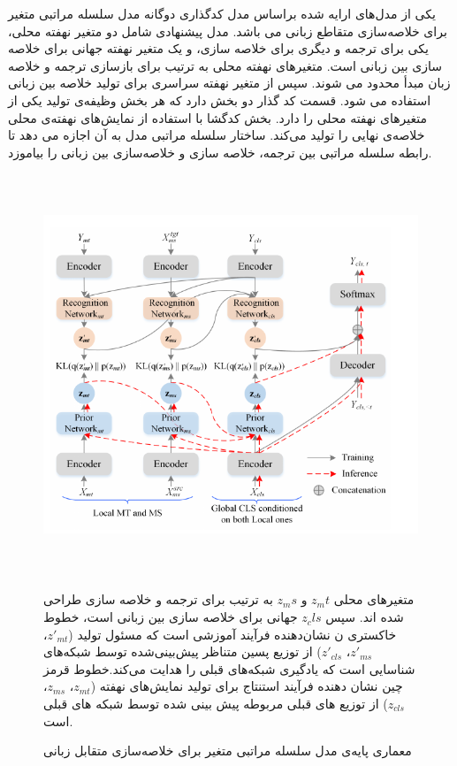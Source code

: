 یکی از مدل‌های ارایه شده براساس مدل کدگذاری دوگانه مدل سلسله مراتبی متغیر برای خلاصه‌سازی متقاطع زبانی
می باشد.  مدل پیشنهادی شامل دو متغیر نهفته محلی، یکی برای ترجمه و دیگری برای خلاصه سازی، و یک متغیر نهفته جهانی برای خلاصه سازی بین زبانی است. متغیرهای نهفته محلی به ترتیب برای بازسازی ترجمه و خلاصه زبان مبدأ محدود می شوند. سپس از متغیر نهفته سراسری برای تولید خلاصه بین زبانی استفاده می شود. قسمت کد گذار دو بخش دارد که هر بخش وظیفه‌ی تولید یکی از متغیرهای نهفته محلی را دارد.
بخش کدگشا با استفاده از نمایش‌های نهفته‌ی محلی خلاصه‌ی نهایی را تولید می‌کند.
ساختار سلسله مراتبی مدل به آن اجازه می دهد تا رابطه سلسله مراتبی بین ترجمه، خلاصه سازی و خلاصه‌سازی بین زبانی را بیاموزد\cite{variational}.

\begin{figure}[!h]
	\begin{center}
		\includegraphics[height=12cm]{Variational Hierarchical Model.png}
	\end{center}
	\caption{معماری پایه‌‌ی مدل سلسله مراتبی متغیر برای خلاصه‌سازی متقابل زبانی\cite{variational}}
	\label{fig:vahie_model}
	\medskip
	\small{
		متغیرهای محلی $ z_mt $ و $ z_ms $ به ترتیب برای ترجمه و خلاصه سازی طراحی شده اند. سپس $ z_cls $ جهانی برای خلاصه سازی بین زبانی است، خطوط خاکستری ن نشان‌دهنده فرآیند آموزشی است که مسئول تولید
		($ z' _{mt} $، $ z'_{ms} $، $ z'_{cls} $)
		از توزیع پسین متناظر پیش‌بینی‌شده توسط شبکه‌های شناسایی است که یادگیری شبکه‌های قبلی را هدایت می‌کند.خطوط قرمز چین نشان دهنده فرآیند استنتاج برای تولید نمایش‌‌های نهفته
		($ z _{mt} $، $ z_{ms} $، $ z_{cls} $)
		از توزیع های قبلی مربوطه پیش بینی شده توسط شبکه های قبلی است.  }
\end{figure}



